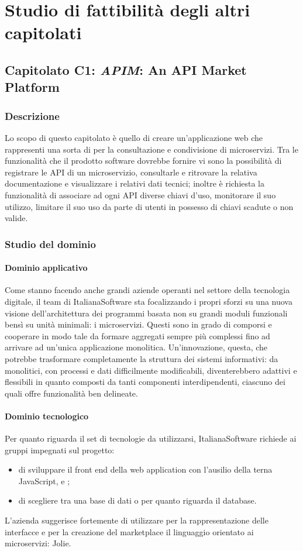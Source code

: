 \newpage

\section{Studio di fattibilità degli altri capitolati}
	\subsection{Capitolato C1: \emph{APIM}: An API Market Platform}
		\subsubsection{Descrizione}
		Lo scopo di questo capitolato è quello di creare un'applicazione web che rappresenti una sorta di  per la consultazione e 
		condivisione di microservizi. Tra le funzionalità che il prodotto software dovrebbe fornire vi sono la possibilità di registrare le API 
		di un microservizio, consultarle e ritrovare la relativa documentazione e visualizzare i relativi dati tecnici; inoltre è richiesta la 
		funzionalità di associare ad ogni API diverse chiavi d'uso, monitorare il suo utilizzo, limitare il suo uso da parte di utenti in possesso 
		di chiavi scadute o non valide.
		\subsubsection{Studio del dominio}
			\paragraph{Dominio applicativo}
			Come stanno facendo anche grandi aziende operanti nel settore della tecnologia digitale, il team di ItalianaSoftware sta focalizzando i propri sforzi su una nuova visione dell'architettura 
			dei programmi basata non su grandi moduli funzionali bensì su unità minimali: i microservizi. Questi sono in grado di comporsi e cooperare in modo 
			tale da formare aggregati sempre più complessi fino ad arrivare ad un'unica applicazione monolitica. Un'innovazione, questa, che potrebbe 
			trasformare completamente la struttura dei sistemi informativi: da monolitici, con processi e dati difficilmente modificabili, diventerebbero 
			adattivi e flessibili in quanto composti da tanti componenti interdipendenti, ciascuno dei quali offre funzionalità ben delineate.
			\paragraph{Dominio tecnologico}
			Per quanto riguarda il set di tecnologie da utilizzarsi, ItalianaSoftware richiede ai gruppi impegnati sul progetto:
			\begin{itemize}
			\item di sviluppare il front end della web application con l'ausilio della terna JavaScript,  e ;
			\item di scegliere tra una base di dati  o  per quanto riguarda il database.\\
			\end{itemize}
			L'azienda suggerisce fortemente di utilizzare per la rappresentazione delle interfacce e per la creazione del marketplace
			il linguaggio orientato ai microservizi: Jolie.
